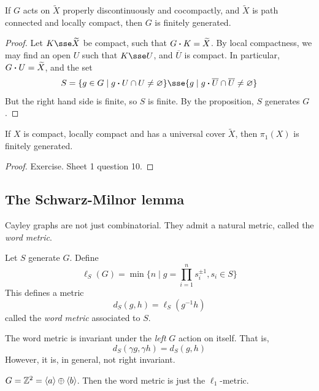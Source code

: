 \documentclass{article}
\begin{document}
\begin{corollary}
    If \(G\) acts on \(\widetilde X\) properly discontinuously and cocompactly, and \(\widetilde X\) is path connected and locally compact, then \(G\) is finitely generated.
\end{corollary}

\lec

\begin{proof}
    Let \(K \sse \widetilde X\) be compact, such that \(G \vdot K = \widetilde X\). By local compactness, we may find an open \(U\) such that \(K \sse U\), and \(\overline U\) is compact. In particular, \(G \vdot U = \widetilde X\), and the set
    \[S = \{g \in G \mid g\vdot U \cap U \ne \emptyset\} \sse \{g \mid g \vdot  \overline U \cap \overline U \ne \emptyset\}\]
    But the right hand side is finite, so \(S\) is finite. By the proposition, \(S\) generates \(G\).
\end{proof}

\begin{corollary}
    If \(X\) is compact, locally compact and has a universal cover \(\widetilde X\), then \(\pi_1(X)\) is finitely generated.
\end{corollary}

\begin{proof}
    Exercise. Sheet 1 question 10.
\end{proof}

\subsection{The Schwarz-Milnor lemma}

Cayley graphs are not just combinatorial. They admit a natural metric, called the \emph{word metric}.

\begin{definition}
     Let \(S\) generate \(G\). Define
    \[\ell_S(G) = \min\{n \mid g = \prod_{i=1}^n s_i^{\pm 1}, s_i \in S\}\]
    This defines a metric
    \[d_S(g, h) = \ell_S(g^{-1}h)\]
    called the \emph{word metric} associated to \(S\).
\end{definition}

The word metric is invariant under the \emph{left} \(G\) action on itself. That is,
\[d_S(\gamma g, \gamma h) = d_S(g, h)\]
However, it is, in general, not right invariant.

\begin{example}
    \(G = \mathbb{Z}^2 = \left\langle a \right\rangle \oplus \left\langle b \right\rangle\). Then the word metric is just the \(\ell_1\)-metric.
\end{example}
\end{document}
